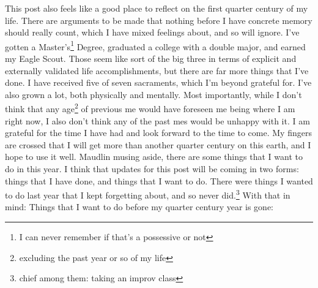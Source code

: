 \documentclass[12pt]{article}[titlepage]
\newcommand{\1}{\={a}}
\newcommand{\2}{\={e}}
\newcommand{\3}{\={\i}}
\newcommand{\4}{\=o}
\newcommand{\5}{\=u}
\newcommand{\6}{\={A}}
\renewcommand{\,}{\textsuperscript{,}}
\begin{document}
This post also feels like a good place to reflect on the first quarter century of my life. There are arguments to be made that nothing before I have concrete memory should really count, which I have mixed feelings about, and so will ignore. I've gotten a Master's\footnote{I can never remember if that's a possessive or not} Degree, graduated a college with a double major, and earned my Eagle Scout. Those seem like sort of the big three in terms of explicit and externally validated life accomplishments, but there are far more things that I've done. I have received five of seven sacraments, which I'm beyond grateful for.
 I've also grown a lot, both physically and mentally. Most importantly, while I don't think that any age\footnote{excluding the past year or so of my life} of previous me would have foreseen me being where I am right now, I also don't think any of the past mes would be unhappy with it. I am grateful for the time I have had and look forward to the time to come. My fingers are crossed that I will get more than another quarter century on this earth, and I hope to use it well.
 Maudlin musing aside, there are some things that I want to do in this year. I think that updates for this post will be coming in two forms: things that I have done, and things that I want to do. There were things I wanted to do last year that I kept forgetting about, and so never did.\footnote{chief among them: taking an improv class} With that in mind:
 Things that I want to do before my quarter century year is gone:
\end{document}
